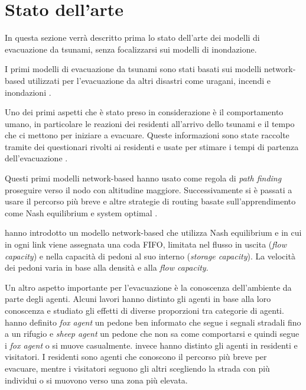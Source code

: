 \section{Stato dell'arte}
\label{sec:stato-arte}
In questa sezione verrà descritto prima lo stato dell'arte dei modelli di evacuazione da tsunami, senza focalizzarsi sui modelli di inondazione.

I primi modelli di evacuazione da tsunami sono stati basati sui modelli network-based utilizzati per l'evacuazione da altri disastri come
uragani, incendi e inondazioni \parencite{usuzawa1997development, imamura2001development}.

Uno dei primi aspetti che è stato preso in considerazione è il comportamento umano,
in particolare le reazioni dei residenti all'arrivo dello tsunami
e il tempo che ci mettono per iniziare a evacuare.
%
Queste informazioni sono state raccolte tramite dei questionari rivolti ai residenti
e usate per stimare i tempi di partenza dell'evacuazione \parencite{imamura2001development, saito2004simulation}.

Questi primi modelli network-based hanno usato come regola di \textit{path finding}
proseguire verso il nodo con altitudine maggiore.
Successivamente si è passati a usare il percorso
più breve \parencite{katada2004disaster} e altre strategie di routing basate sull'apprendimento 
come Nash equilibrium e system optimal \parencite{lammel2009towards}.

\textcite{lammel2010emergency} hanno introdotto un modello network-based che utilizza Nash equilibrium e in cui in ogni link viene assegnata una coda FIFO,
limitata nel flusso in uscita (\textit{flow capacity}) e nella capacità di pedoni al suo interno (\textit{storage capacity}).
La velocità dei pedoni varia in base alla densità e alla \textit{flow capacity}.

Un altro aspetto importante per l'evacuazione è la conoscenza dell'ambiente da parte degli agenti.
Alcuni lavori hanno distinto gli agenti in base alla loro conoscenza e
studiato gli effetti di diverse proporzioni tra categorie di agenti.
\textcite{nguyen2012simulation} hanno definito \textit{fox agent} un pedone ben informato che segue i segnali
stradali fino a un rifugio e \textit{sheep agent} un pedone che non sa
come comportarsi e quindi segue i \textit{fox agent} o si muove casualmente.
\textcite{takabatake2017simulated} invece hanno distinto gli agenti in residenti e visitatori.
I residenti sono agenti che conoscono il percorso più breve per evacuare, mentre i visitatori
seguono gli altri scegliendo la strada con più individui o si muovono verso una zona più elevata.

